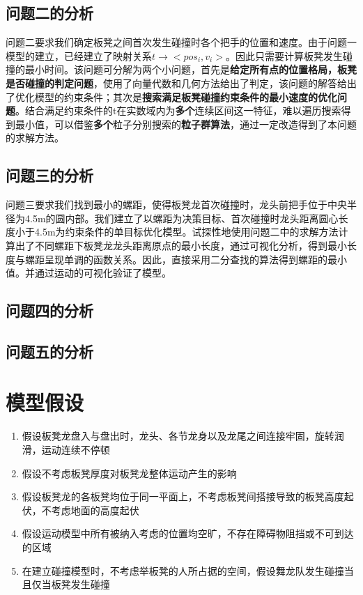 \documentclass[a4paper]{article}
\begin{document}
	\subsection{问题二的分析}
                问题二要求我们确定板凳之间首次发生碰撞时各个把手的位置和速度。由于问题一模型的建立，已经建立了映射关系$t\to<pos_i,v_i>$。因此只需要计算板凳发生碰撞的最小时间。该问题可分解为两个小问题，首先是\textbf{给定所有点的位置格局，板凳是否碰撞的判定问题}，使用了向量代数和几何方法给出了判定，该问题的解答给出了优化模型的约束条件；其次是\textbf{搜索满足板凳碰撞约束条件的最小速度的优化问题}。结合满足约束条件的t在实数域内为\textbf{多个}连续区间这一特征，难以遍历搜索得到最小值，可以借鉴\textbf{多个}粒子分别搜索的\textbf{粒子群算法}，通过一定改造得到了本问题的求解方法。
	\subsection{问题三的分析}
 问题三要求我们找到最小的螺距，使得板凳龙首次碰撞时，龙头前把手位于中央半径为4.5m的圆内部。我们建立了以螺距为决策目标、首次碰撞时龙头距离圆心长度小于4.5m为约束条件的单目标优化模型。试探性地使用问题二中的求解方法计算出了不同螺距下板凳龙龙头距离原点的最小长度，通过可视化分析，得到最小长度与螺距呈现单调的函数关系。因此，直接采用二分查找的算法得到螺距的最小值。并通过运动的可视化验证了模型。
	\subsection{问题四的分析}
	\subsection{问题五的分析}

	\section{模型假设}
	\begin{enumerate}
		\item 假设板凳龙盘入与盘出时，龙头、各节龙身以及龙尾之间连接牢固，旋转润滑，运动连续不停顿
		\item 假设不考虑板凳厚度对板凳龙整体运动产生的影响
		\item 假设板凳龙的各板凳均位于同一平面上，不考虑板凳间搭接导致的板凳高度起伏，不考虑地面的高度起伏
            \item 假设运动模型中所有被纳入考虑的位置均空旷，不存在障碍物阻挡或不可到达的区域
            \item 在建立碰撞模型时，不考虑举板凳的人所占据的空间，假设舞龙队发生碰撞当且仅当板凳发生碰撞
	\end{enumerate}
\end{document}
